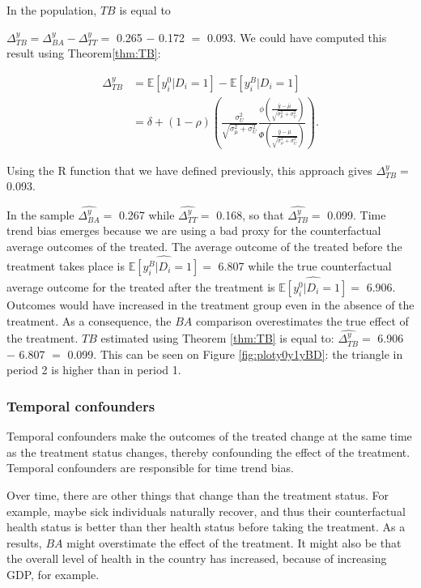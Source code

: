 \documentclass[]{book}
\newcommand{\esp}[1]{\mathbb{E}[ #1 ]}
\theoremstyle{definition}
\theoremstyle{definition}
\theoremstyle{definition}
\theoremstyle{remark}
\let\BeginKnitrBlock\begin \let\EndKnitrBlock\end
\begin{document}
\BeginKnitrBlock{example}
\protect\hypertarget{exm:unnamed-chunk-28}{}{\label{exm:unnamed-chunk-28}
}In the population, \(TB\) is equal to
\EndKnitrBlock{example} \(\Delta^y_{TB}=\Delta^y_{BA}-\Delta^y_{TT}=\)
0.265 \(-\) 0.172 \(=\) 0.093. We could have computed this result using
Theorem\ref{thm:TB}:

\begin{align*}
\Delta^y_{TB} & = \esp{y_i^0|D_i=1}-\esp{y_i^B|D_i=1} \\
              & = \delta + (1-\rho)\left(\frac{\sigma^2_{U}}{\sqrt{\sigma^2_{\mu}+\sigma^2_{U}}}\frac{\phi\left(\frac{\bar{y}-\bar{\mu}}{\sqrt{\sigma^2_{\mu}+\sigma^2_{U}}}\right)}{\Phi\left(\frac{\bar{y}-\bar{\mu}}{\sqrt{\sigma^2_{\mu}+\sigma^2_{U}}}\right)}\right).
\end{align*}

Using the R function that we have defined previously, this approach
gives \(\Delta^y_{TB}=\) 0.093.

In the sample \(\hat{\Delta^y_{BA}}=\) 0.267 while
\(\hat{\Delta^y_{TT}}=\) 0.168, so that \(\hat{\Delta^y_{TB}}=\) 0.099.
Time trend bias emerges because we are using a bad proxy for the
counterfactual average outcomes of the treated. The average outcome of
the treated before the treatment takes place is
\(\hat{\esp{y_i^B|D_i=1}}=\) 6.807 while the true counterfactual average
outcome for the treated after the treatment is
\(\hat{\esp{y_i^0|D_i=1}}=\) 6.906. Outcomes would have increased in the
treatment group even in the absence of the treatment. As a consequence,
the \(BA\) comparison overestimates the true effect of the treatment.
\(TB\) estimated using Theorem \ref{thm:TB} is equal to:
\(\hat{\Delta^y_{TB}}=\) 6.906 \(-\) 6.807 \(=\) 0.099. This can be seen
on Figure \ref{fig:ploty0y1yBD}: the triangle in period 2 is higher than
in period 1.

\subsubsection{Temporal confounders}\label{temporal-confounders}

Temporal confounders make the outcomes of the treated change at the same
time as the treatment status changes, thereby confounding the effect of
the treatment. Temporal confounders are responsible for time trend bias.

Over time, there are other things that change than the treatment status.
For example, maybe sick individuals naturally recover, and thus their
counterfactual health status is better than ther health status before
taking the treatment. As a results, \(BA\) might overstimate the effect
of the treatment. It might also be that the overall level of health in
the country has increased, because of increasing GDP, for example.
\end{document}
